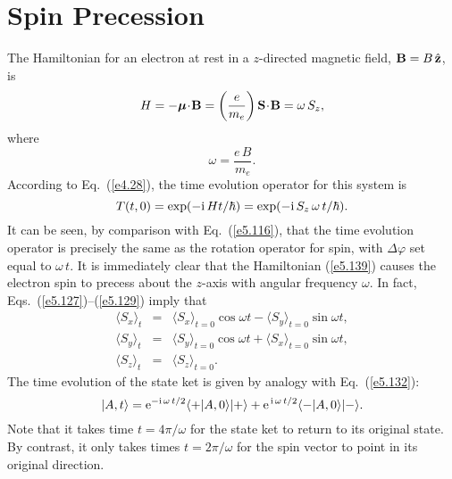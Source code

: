 \section{Spin Precession}
The Hamiltonian for an electron at rest in a $z$-directed  magnetic field, ${\bf B}=
B\,\hat{ {\bf z}}$,
is
\begin{equation}\label{e5.139}
H = - \mbox{\boldmath$\mu$}\! \cdot \!{\bf B} = \left(\frac{e}{m_e}\right) {\bf S}\! \cdot\! {\bf B}
= \omega\, S_z,
\end{equation}
where
\begin{equation}\label{e5.140}
\omega = \frac{e\,B}{m_e}.
\end{equation}
According to Eq.~(\ref{e4.28}), the time evolution operator for this system is
\begin{equation}
T(t,0) = \exp(-{\rm i} \,H t/\hbar) = \exp(-{\rm i} \,S_z\, \omega\, t/\hbar).
\end{equation}
It can be seen, by comparison with Eq.~(\ref{e5.116}), that the time evolution operator
is precisely the same as the rotation operator for spin, with $\Delta\varphi$ set
equal to $\omega \,t$. It is immediately clear that the Hamiltonian (\ref{e5.139})
 causes the electron 
spin to precess about the $z$-axis with angular frequency $\omega$. In fact,
Eqs.~(\ref{e5.127})--(\ref{e5.129}) imply  that
\begin{eqnarray}
\langle S_x\rangle_t &=& \langle S_x\rangle_{t=0} \cos\omega t - 
\langle S_y\rangle_{t=0} \sin\omega t,\\[0.5ex]
\langle S_y\rangle_t &=& \langle S_y\rangle_{t=0} \cos\omega t +
\langle S_x\rangle_{t=0} \sin\omega t,\\[0.5ex]
\langle S_z\rangle_t&=& \langle S_z\rangle_{t=0}.
\end{eqnarray}
The time evolution of the state ket is given by analogy with Eq.~(\ref{e5.132}):
\begin{equation}
|A, t\rangle = {\rm e}^{-{\rm i}\,\omega \,t/2}
\langle +|A, 0\rangle |+\rangle +  {\rm e}^{\,{\rm i}\,\omega \,t/2}
\langle -|A, 0\rangle |-\rangle.
\end{equation}
Note that it takes time $t= 4\pi/\omega$ for the state ket to return  to its
original state. 
By contrast, it only takes times $t=2\pi/\omega$ for the spin vector to point
in its original direction. 


